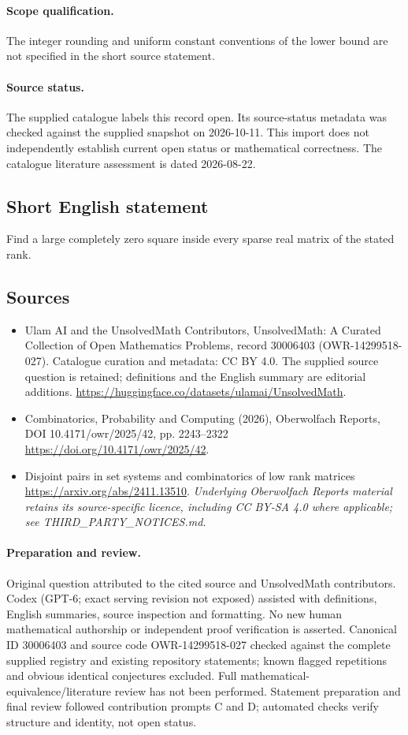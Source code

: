 \documentclass[11pt]{article}
\begin{document}
\paragraph{Scope qualification.}
The integer rounding and uniform constant conventions of the lower bound are not specified in the short source statement.
\paragraph{Source status.}
The supplied catalogue labels this record open. Its source-status metadata was checked against the supplied snapshot on 2026-10-11. This import does not independently establish current open status or mathematical correctness. The catalogue literature assessment is dated 2026-08-22.
\subsection{Short English statement}
Find a large completely zero square inside every sparse real matrix of the stated rank.
\subsection{Sources}
\begin{itemize}
\item[S1] Ulam AI and the UnsolvedMath Contributors, UnsolvedMath: A Curated Collection of Open Mathematics Problems, record 30006403 (OWR-14299518-027). Catalogue curation and metadata: CC BY 4.0. The supplied source question is retained; definitions and the English summary are editorial additions.
\url{https://huggingface.co/datasets/ulamai/UnsolvedMath}.
\item[S2] Combinatorics, Probability and Computing (2026), Oberwolfach Reports, DOI 10.4171/owr/2025/42, pp. 2243--2322
\url{https://doi.org/10.4171/owr/2025/42}.
\item[S3] Disjoint pairs in set systems and combinatorics of low rank matrices
\url{https://arxiv.org/abs/2411.13510}.
\textit{Underlying Oberwolfach Reports material retains its source-specific licence, including CC BY-SA 4.0 where applicable; see THIRD\_PARTY\_NOTICES.md.}
\end{itemize}
\paragraph{Preparation and review.}
Original question attributed to the cited source and UnsolvedMath contributors. Codex (GPT-6; exact serving revision not exposed) assisted with definitions, English summaries, source inspection and formatting. No new human mathematical authorship or independent proof verification is asserted. Canonical ID 30006403 and source code OWR-14299518-027 checked against the complete supplied registry and existing repository statements; known flagged repetitions and obvious identical conjectures excluded. Full mathematical-equivalence/literature review has not been performed. Statement preparation and final review followed contribution prompts C and D; automated checks verify structure and identity, not open status.
\label{end:30006403}
\end{document}

